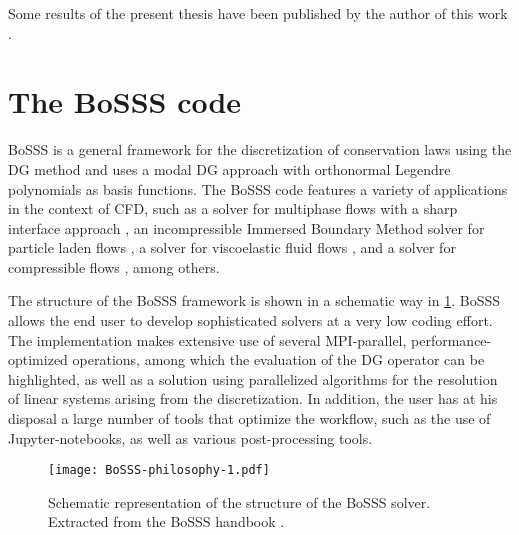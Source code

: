 Some results of the present thesis have been published by the author of this work \parencite{gutierrez-jorqueraFullyCoupledHigh2022}.


\section{The BoSSS code}
BoSSS is a general framework for the discretization of conservation laws using the DG method and uses a modal DG approach with orthonormal Legendre polynomials as basis functions. The BoSSS code features a variety of applications in the context of \Gls{CFD}, such as a solver for multiphase flows with a sharp interface approach \parencite{kummerExtendedDiscontinuousGalerkin2017}, an incompressible Immersed Boundary Method solver for particle laden flows \parencite{krauseIncompressibleImmersedBoundary2017}, a solver for viscoelastic fluid flows \parencite{kikkerFullyCoupledHighorder}, and a solver for compressible flows \parencite{geisenhoferDiscontinuousGalerkinImmersed2019}, among others.

The structure of the BoSSS framework is shown in a schematic way in \cref{Fig:BoSSS}. BoSSS allows the end user to develop sophisticated solvers at a very low coding effort. The implementation makes extensive use of several \gls{MPI}-parallel, performance-optimized operations, among which the evaluation of the DG operator can be highlighted, as well as a solution using parallelized algorithms for the resolution of linear systems arising from the discretization. In addition, the user has at his disposal a large number of tools that optimize the workflow, such as the use of Jupyter-notebooks, as well as various post-processing tools.
\begin{figure}
	\texttt{[image: BoSSS-philosophy-1.pdf]}
	\caption[Schematic representation of the structure of the BoSSS solver.]{Schematic representation of the structure of the BoSSS solver. Extracted from the BoSSS handbook \parencite{kummer2020}.}
	\label{Fig:BoSSS}
\end{figure}

